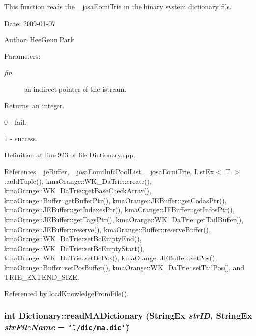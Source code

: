 This function reads the \_\-josaEomiTrie in the binary system dictionary file. 

\begin{Desc}
\item[Date:]2009-01-07 \end{Desc}
\begin{Desc}
\item[Author:]HeeGeun Park \end{Desc}
\begin{Desc}
\item[Parameters:]
\begin{description}
\item[{\em fin}]an indirect pointer of the istream. \end{description}
\end{Desc}
\begin{Desc}
\item[Returns:]an integer.\par
 0 - fail.\par
 1 - success. \end{Desc}


Definition at line 923 of file Dictionary.cpp.

References \_\-jeBuffer, \_\-josaEomiInfoPoolList, \_\-josaEomiTrie, ListEx$<$ T $>$::addTuple(), kmaOrange::WK\_\-DaTrie::create(), kmaOrange::WK\_\-DaTrie::getBaseCheckArray(), kmaOrange::Buffer::getBufferPtr(), kmaOrange::JEBuffer::getCodasPtr(), kmaOrange::JEBuffer::getIndexesPtr(), kmaOrange::JEBuffer::getInfosPtr(), kmaOrange::JEBuffer::getTagsPtr(), kmaOrange::WK\_\-DaTrie::getTailBuffer(), kmaOrange::JEBuffer::reserve(), kmaOrange::Buffer::reserveBuffer(), kmaOrange::WK\_\-DaTrie::setBcEmptyEnd(), kmaOrange::WK\_\-DaTrie::setBcEmptyStart(), kmaOrange::WK\_\-DaTrie::setBcPos(), kmaOrange::JEBuffer::setPos(), kmaOrange::Buffer::setPosBuffer(), kmaOrange::WK\_\-DaTrie::setTailPos(), and TRIE\_\-EXTEND\_\-SIZE.

Referenced by loadKnowledgeFromFile().\hypertarget{classkmaOrange_1_1Dictionary_0741c5adbb28282b056723bfe896dacb}{
\subsubsection[{readMADictionary}]{\setlength{\rightskip}{0pt plus 5cm}int Dictionary::readMADictionary ({\bf StringEx} {\em strID}, \/  {\bf StringEx} {\em strFileName} = {\tt \char`\"{}./dic/ma.dic\char`\"{}})}}
\label{classkmaOrange_1_1Dictionary_0741c5adbb28282b056723bfe896dacb}


